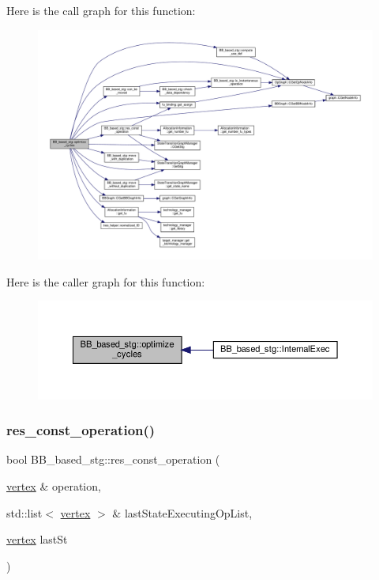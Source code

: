 Here is the call graph for this function\+:
\nopagebreak
\begin{figure}[H]
\begin{center}
\leavevmode
\includegraphics[width=350pt]{dd/d84/classBB__based__stg_a949d51a84f969e119444a89cd98e8d15_cgraph}
\end{center}
\end{figure}
Here is the caller graph for this function\+:
\nopagebreak
\begin{figure}[H]
\begin{center}
\leavevmode
\includegraphics[width=350pt]{dd/d84/classBB__based__stg_a949d51a84f969e119444a89cd98e8d15_icgraph}
\end{center}
\end{figure}
\mbox{\label{classBB__based__stg_a9e4b411f10ee8124e676cfcfa4b4e71d}} 
\subsubsection{\texorpdfstring{res\+\_\+const\+\_\+operation()}{res\_const\_operation()}}
{\footnotesize\ttfamily bool B\+B\+\_\+based\+\_\+stg\+::res\+\_\+const\+\_\+operation (\begin{DoxyParamCaption}\item[{\hyperlink{graph_8hpp_abefdcf0544e601805af44eca032cca14}{vertex} \&}]{operation,  }\item[{std\+::list$<$ \hyperlink{graph_8hpp_abefdcf0544e601805af44eca032cca14}{vertex} $>$ \&}]{last\+State\+Executing\+Op\+List,  }\item[{\hyperlink{graph_8hpp_abefdcf0544e601805af44eca032cca14}{vertex}}]{last\+St }\end{DoxyParamCaption})\hspace{0.3cm}{\ttfamily [private]}}



